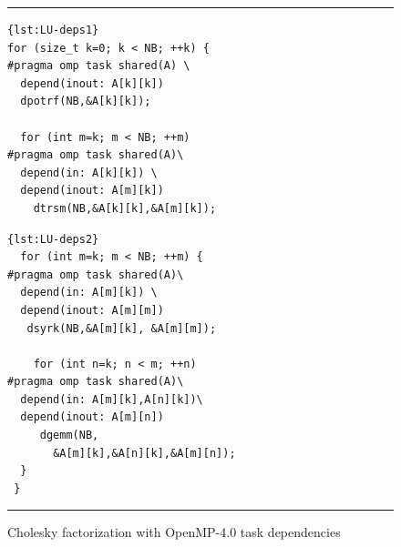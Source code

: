 \documentclass{Styles/llncs}
\begin{document}
\begin{figure}[tbp]
\hrule
\begin{minipage}[t]{.43\textwidth}
\begin{lstlisting}[frame=none,style=smaller,showlines=true,label=lst:LU-deps]{lst:LU-deps1}
for (size_t k=0; k < NB; ++k) {
#pragma omp task shared(A) \
  depend(inout: A[k][k]) 
  dpotrf(NB,&A[k][k]);

  for (int m=k; m < NB; ++m) 
#pragma omp task shared(A)\
  depend(in: A[k][k]) \
  depend(inout: A[m][k]) 
    dtrsm(NB,&A[k][k],&A[m][k]);

\end{lstlisting}
\end{minipage}\hfill
\begin{minipage}[t]{.485\textwidth}
\begin{lstlisting}[frame=none,style=smaller,label=lst:LU-deps,firstnumber=12]{lst:LU-deps2}
  for (int m=k; m < NB; ++m) {
#pragma omp task shared(A)\
  depend(in: A[m][k]) \
  depend(inout: A[m][m]) 
   dsyrk(NB,&A[m][k], &A[m][m]);

    for (int n=k; n < m; ++n)
#pragma omp task shared(A)\
  depend(in: A[m][k],A[n][k])\
  depend(inout: A[m][n]) 
     dgemm(NB,
       &A[m][k],&A[n][k],&A[m][n]);
  }
 }
\end{lstlisting}
\end{minipage}
\hrule
\caption{Cholesky factorization with OpenMP-4.0 task dependencies} \label{lulst}
\end{figure}

%
%
\end{document}
